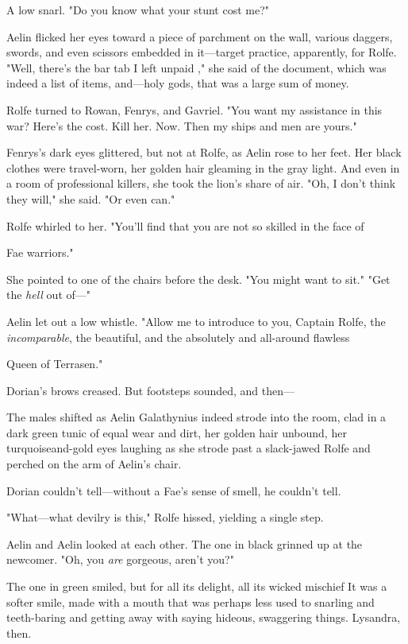 A low snarl. "Do you know what your stunt cost me?"

Aelin flicked her eyes toward a piece of parchment on the wall, various daggers, swords, and even scissors embedded in it---target practice, apparently, for Rolfe. "Well, there's the bar tab I left unpaid
 ," she said of the document, which was indeed a list of items, and---holy gods, that was a large sum of money.

Rolfe turned to Rowan, Fenrys, and Gavriel. "You want my assistance in this war? Here's the cost. Kill her. Now. Then my ships and men are yours."

Fenrys's dark eyes glittered, but not at Rolfe, as Aelin rose to her feet. Her black clothes were travel-worn, her golden hair gleaming in the gray light. And even in a room of professional killers, she took the lion's share of air. "Oh, I don't think they will," she said. "Or even can."

Rolfe whirled to her. "You'll find that you are not so skilled in the face of

Fae warriors."

She pointed to one of the chairs before the desk. "You might want to sit." "Get the \emph{hell} out of---"

Aelin let out a low whistle. "Allow me to introduce to you, Captain Rolfe, the \emph{incomparable}, the beautiful, and the absolutely and all-around flawless

Queen of Terrasen."

Dorian's brows creased. But footsteps sounded, and then---

The males shifted as Aelin Galathynius indeed strode into the room, clad in a dark green tunic of equal wear and dirt, her golden hair unbound, her turquoiseand-gold eyes laughing as she strode past a slack-jawed Rolfe and perched on the arm of Aelin's chair.

Dorian couldn't tell---without a Fae's sense of smell, he couldn't tell.

"What---what devilry is this," Rolfe hissed, yielding a single step.

Aelin and Aelin looked at each other. The one in black grinned up at the newcomer. "Oh, you \emph{are} gorgeous, aren't you?"

The one in green smiled, but for all its delight, all its wicked mischief  It was a softer smile, made with a mouth that was perhaps less used to snarling and teeth-baring and getting away with saying hideous, swaggering things. Lysandra, then.

